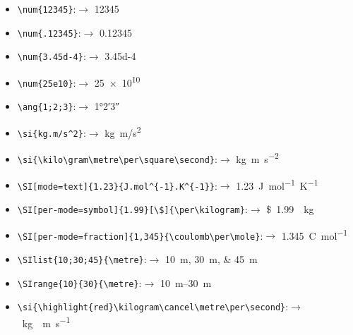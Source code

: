 \documentclass[11pt,a4paper]{article}
\begin{document}
\begin{itemize}[noitemsep]
	\item \verb|\num{12345}|:$\rightarrow$ \num{12345}
	\item \verb|\num{.12345}|:$\rightarrow$  \num{.12345}
	\item \verb|\num{3.45d-4}|:$\rightarrow$  \num{3.45d-4}
	\item \verb|\num{25e10}|:$\rightarrow$  \num{25e10}
	\item \verb|\ang{1;2;3}|:$\rightarrow$  \ang{1;2;3}
	\item \verb|\si{kg.m/s^2}|:$\rightarrow$  \si{kg.m/s^2}
	\item \verb|\si{\kilo\gram\metre\per\square\second}|:$\rightarrow$  \si{\kilo\gram\metre\per\square\second}
	\item \verb|\SI[mode=text]{1.23}{J.mol^{-1}.K^{-1}}|:$\rightarrow$  \SI[mode=text]{1.23}{J.mol^{-1}.K^{-1}}
	\item \verb|\SI[per-mode=symbol]{1.99}[\$]{\per\kilogram}|:$\rightarrow$  \SI[per-mode=symbol]{1.99}[\$]{\per\kilogram}
	\item \verb|\SI[per-mode=fraction]{1,345}{\coulomb\per\mole}|:$\rightarrow$  \SI[per-mode=fraction]{1,345}{\coulomb\per\mole}
	\item \verb|\SIlist{10;30;45}{\metre}|:$\rightarrow$  \SIlist{10;30;45}{\metre}
	\item \verb|\SIrange{10}{30}{\metre}|:$\rightarrow$  \SIrange{10}{30}{\metre}
	\item \verb|\si{\highlight{red}\kilogram\cancel\metre\per\second}|:$\rightarrow$  \si{\kilogram\cancel\metre\per\second}
\end{itemize}
\end{document}
